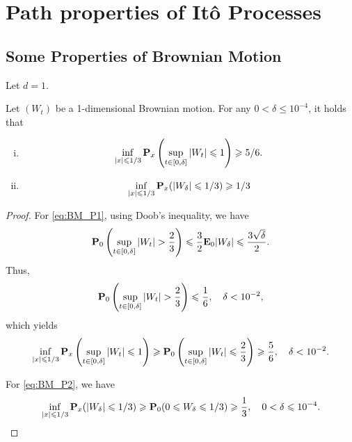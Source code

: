 
\chapter{Path properties of Itô Processes}

\section{Some Properties of Brownian Motion}
Let \(d=1\). 

\begin{lemma}\label{lem:BM_P0}
    Let \((W_t)\) be a 1-dimensional Brownian motion. For any \(0<\delta\leq 10^{-4}\), it holds that 
    \begin{enumerate}[(i)]
        \item 
        \begin{equation}\label{eq:BM_P1}
            \inf_{|x|\leqslant 1/3} {\mathbf P}_x\left(\sup_{t\in [0,\delta]} |W_t|\leqslant 1\right)\geqslant 5/6. 
        \end{equation}
        \item 
        \begin{equation}\label{eq:BM_P2}
            \inf_{|x|\leqslant 1/3} {\mathbf P}_x (|W_{\delta}|\leqslant 1/3)\geqslant 1/3
        \end{equation}
    \end{enumerate}
    
\end{lemma}
\begin{proof}
    For \eqref{eq:BM_P1}, using Doob's inequality, we have 
    \[
        \bP_0\l(\sup_{t\in [0,\delta]} |W_t|> \frac{2}{3}\r) \leq \frac{3}{2} \bE_0 |W_{\delta}| \leq \frac{3\sqrt{\delta}}{2}. 
    \]
    Thus, 
    \[
        \bP_0\l(\sup_{t\in [0,\delta]} |W_t|> \frac{2}{3}\r)\leq \frac{1}{6}, \quad \delta<10^{-2},  
    \]
    which yields 
    \[
        \inf_{|x|\leqslant 1/3} {\mathbf P}_x\left(\sup_{t\in [0,\delta]} |W_t|\leqslant 1\right)\geqslant{\mathbf P}_0\left(\sup_{t\in [0,\delta]} |W_t|\leqslant \frac{2}{3}\right) \geqslant \frac{5}{6}, \quad \delta<10^{-2}. 
    \]

    For \eqref{eq:BM_P2}, we have 
    \[
    \inf_{|x|\leqslant 1/3} {\mathbf P}_x (|W_{\delta}|\leqslant 1/3)\geqslant {\mathbf P}_0 (0\leqslant W_\delta \leqslant 1/3) \geqslant \frac{1}{3}, \quad 0<\delta\leqslant 10^{-4}. 
    \]
\end{proof}

